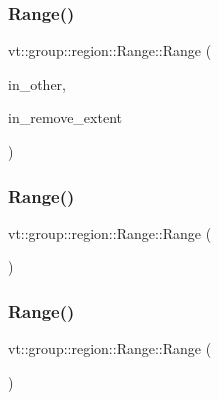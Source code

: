\subsubsection{\texorpdfstring{Range()}{Range()}\hspace{0.1cm}{\footnotesize\ttfamily [2/4]}}
{\footnotesize\ttfamily vt\+::group\+::region\+::\+Range\+::\+Range (\begin{DoxyParamCaption}\item[{\hyperlink{structvt_1_1group_1_1region_1_1_range}{Range} const \&}]{in\+\_\+other,  }\item[{\hyperlink{structvt_1_1group_1_1region_1_1_region_abf426ff85bed72c1c6524fad6a9f1751}{Bound\+Type}}]{in\+\_\+remove\+\_\+extent }\end{DoxyParamCaption})}

\mbox{\label{structvt_1_1group_1_1region_1_1_range_aaf4f48ee287bd842d3a0c1260737bcb1}} 
\subsubsection{\texorpdfstring{Range()}{Range()}\hspace{0.1cm}{\footnotesize\ttfamily [3/4]}}
{\footnotesize\ttfamily vt\+::group\+::region\+::\+Range\+::\+Range (\begin{DoxyParamCaption}\item[{\hyperlink{structvt_1_1group_1_1region_1_1_range}{Range} const \&}]{ }\end{DoxyParamCaption})\hspace{0.3cm}{\ttfamily [default]}}

\mbox{\label{structvt_1_1group_1_1region_1_1_range_a58248b99e3e8dfbf73a014d2af6f238c}} 
\subsubsection{\texorpdfstring{Range()}{Range()}\hspace{0.1cm}{\footnotesize\ttfamily [4/4]}}
{\footnotesize\ttfamily vt\+::group\+::region\+::\+Range\+::\+Range (\begin{DoxyParamCaption}\item[{\hyperlink{structvt_1_1group_1_1region_1_1_range}{Range} \&\&}]{ }\end{DoxyParamCaption})\hspace{0.3cm}{\ttfamily [default]}}



